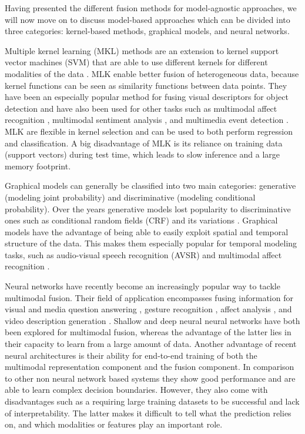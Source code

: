\documentclass{article}
\begin{document}
Having presented the different fusion methods for model-agnostic approaches, we will now move on to discuss model-based approaches which can be divided into three categories: kernel-based methods, graphical models, and neural networks.

Multiple kernel learning (MKL) methods are an extension to kernel support vector machines (SVM) that are able to use different kernels for different modalities of the data \citep{goenen2011kernel}. MLK enable better fusion of heterogeneous data, because kernel functions can be seen as similarity functions between data points. They have been an especially popular method for fusing visual descriptors for object detection \citep{bucak2014kernel, gehler2009kernel, krizhevsky2012imagenet} and have also been used for other tasks such as multimodal affect recognition \citep{chen2014recog, jaques2015multi, sikka2013multiple}, multimodal sentiment analysis \citep{poria2015deep}, and multimedia event detection \citep{yeh2012novel}. MLK are flexible in kernel selection and can be used to both perform regression and classification. A big disadvantage of MLK is its reliance on training data (support vectors) during test time, which leads to slow inference and a large memory footprint.

Graphical models can generally be classified into two main categories: generative (modeling joint probability) and discriminative (modeling conditional probability). Over the years generative models lost popularity to discriminative ones such as conditional random fields (CRF) \citep{lafferty2001crf} and its variations \citep{quattoni2007hcrf, song2012multi, qin2009global}. Graphical models have the advantage of being able to easily exploit spatial and temporal structure of the data. This makes them especially popular for temporal modeling tasks, such as audio-visual speech recognition (AVSR) \citep{gurban2008dynamic} and multimodal affect recognition \citep{baltrusaitis2013dimensional}.

Neural networks have recently become an increasingly popular way to tackle multimodal fusion. Their field of application encompasses fusing information for visual and media question answering \citep{gao2015are, malinowski2015ask, xu2016ask}, gesture recognition \citep{neverova2016moddrop}, affect analysis \citep{kahou2015EmoNets,nojavanasghari2016deep}, and video description generation \citep{jin2016video, venugopalan2016improving}. Shallow \citep{gao2015are} and deep \citep{nojavanasghari2016deep, venugopalan2016improving} neural neural networks have both been explored for multimodal fusion, whereas the advantage of the latter lies in their capacity to learn from a large amount of data. Another advantage of recent neural architectures is their ability for end-to-end training of both the multimodal representation component and the fusion component. In comparison to other non neural network based systems they show good performance and are able to learn complex decision boundaries. However, they also come with disadvantages such as a requiring large training datasets to be successful and lack of interpretability. The latter makes it difficult to tell what the prediction relies on, and which modalities or features play an important role.
\end{document}
